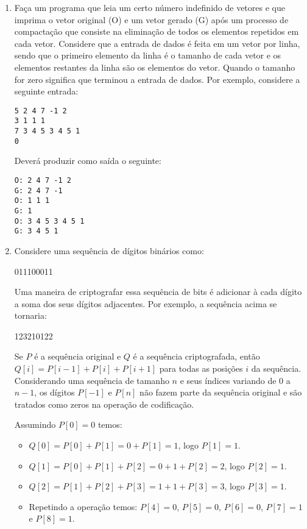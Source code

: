\begin{enumerate}
\item Faça um programa que leia um certo número indefinido de
vetores e que imprima o vetor original (O) e um vetor gerado (G)
após um processo de compactação
que consiste na eliminação de todos os elementos repetidos
em cada vetor. Considere que a entrada de dados é feita em
um vetor por linha, sendo que o primeiro elemento da linha é
o tamanho de cada vetor e os elementos restantes da linha são
os elementos do vetor. Quando o tamanho for zero significa que 
terminou a entrada de dados. Por exemplo, considere a seguinte
entrada:

\begin{verbatim}
5 2 4 7 -1 2
3 1 1 1 
7 3 4 5 3 4 5 1
0
\end{verbatim}

Deverá produzir como saída o seguinte:

\begin{verbatim}
O: 2 4 7 -1 2
G: 2 4 7 -1
O: 1 1 1
G: 1
O: 3 4 5 3 4 5 1
G: 3 4 5 1
\end{verbatim}

\item Considere uma sequência de dígitos binários como:

011100011

Uma maneira de criptografar essa sequência de bits é adicionar
à cada dígito a soma dos seus dígitos adjacentes. Por exemplo,
a sequência acima se tornaria:

123210122

Se $P$ é a sequência original e $Q$ é a sequência criptografada,
então $Q[i] = P[i-1] + P[i] + P[i+1]$ para todas as posições $i$
da sequência. Considerando uma sequência de tamanho $n$ e seus
índices variando de $0$ a $n-1$, os dígitos $P[-1]$ e $P[n]$ não
fazem parte da sequência original e são tratados como zeros na
operação de codificação.

Assumindo $P[0] = 0$ temos:
\begin{itemize}
\item
$Q[0] = P[0] + P[1] = 0 + P[1] = 1$, logo $P[1] = 1$.
\item
$Q[1] = P[0] + P[1] + P[2] = 0 + 1 + P[2] = 2$, logo $P[2] = 1$.
\item
$Q[2] = P[1] + P[2] + P[3] = 1 + 1 + P[3] = 3$, logo $P[3] = 1$.
\item
Repetindo a operação temos: $P[4] = 0$, $P[5] = 0$, $P[6] = 0$, $P[7] = 1$ e $P[8] = 1$.
\end{itemize}


\end{enumerate}
